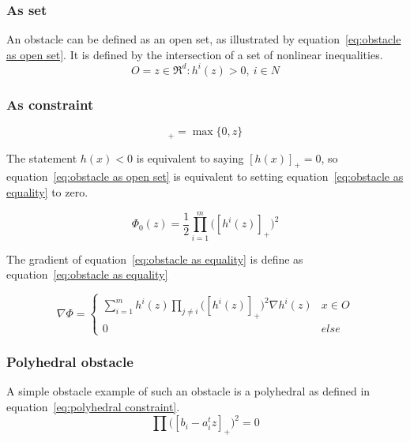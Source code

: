 			\subsubsection{As set}
				An obstacle can be defined as an open set, as illustrated by equation~\ref{eq:obstacle as open set}. It is defined by the intersection of a set of nonlinear inequalities.
				\begin{equation}
					O = {z \in \Re^d : h^i(z)>0,\ i \in N}
					\label{eq:obstacle as open set}
				\end{equation}
				
			\subsubsection{As constraint}
				\begin{equation}
					[z]_+ =  \max\{0,z\}
				\end{equation}
				
				The statement $h(x)<0$ is equivalent to saying $[h(x)]_+=0$, so equation~\ref{eq:obstacle as open set} is equivalent to setting equation~\ref{eq:obstacle as equality} to zero.
				
				\begin{equation}
					\Phi_0(z) =  \frac{1}{2} \prod_{i=1}^m \Big( [h^i(z)]_+ \Big)^2
					\label{eq:obstacle as equality}
				\end{equation}
				
				The gradient of equation~\ref{eq:obstacle as equality} is define as equation~\ref{eq:obstacle as equality}
				
				\begin{equation}
					\nabla \Phi =
					\begin{cases}
						\sum_{i=1}^{m} h^i(z)\prod_{j \ne i} \Big( [h^i(z)]_+ \Big)^2 \nabla h^i(z)
						& x \in O \\
						0 & else
					\end{cases}
					\label{eq:derivative obstacle as equality}
				\end{equation}
			
			\subsubsection{Polyhedral obstacle}
				A simple obstacle example of such an obstacle is a polyhedral as defined in equation~\ref{eq:polyhedral constraint}.
				\begin{equation}
					\prod \Big([b_i - a_i^t z]_+ \Big)^2 = 0
					\label{eq:polyhedral constraint}
				\end{equation}
			
